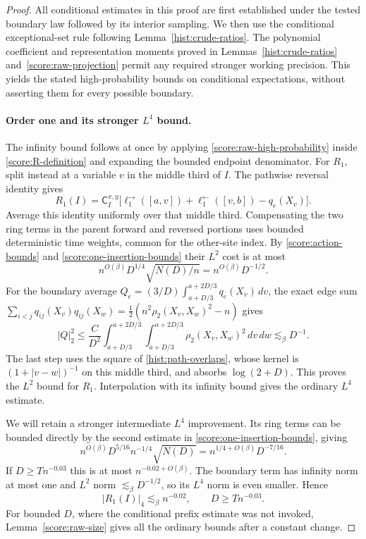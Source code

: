 \begin{proof}
All conditional estimates in this proof are first established under the
tested boundary law followed by its interior sampling.  We then use the
conditional exceptional-set rule following Lemma~\ref{hist:crude-ratios}.
The polynomial coefficient and representation moments proved in
Lemmas~\ref{hist:crude-ratios} and~\ref{score:raw-projection} permit any
required stronger working precision.
This yields the stated high-probability bounds on conditional expectations,
without asserting them for every possible boundary.

\paragraph{Order one and its stronger $L^4$ bound.}
The infinity bound follows at once by applying
\eqref{score:raw-high-probability} inside
\eqref{score:R-definition} and expanding the bounded endpoint denominator.
For $R_1$, split instead at a variable $v$ in the middle third of $I$.
The pathwise reversal identity gives
\[
 R_1(I)=\mathsf C_I^{x,y}\bigl[
       \ell_{1}^{\to}([a,v])+\ell_{1}^{\leftarrow}([v,b])-q_e(X_v)\bigr].
\]
Average this identity uniformly over that middle third.  Compensating the
two ring terms in the parent forward and reversed portions uses bounded
deterministic time weights, common for the other-site index.  By
\eqref{score:action-bounds} and \eqref{score:one-insertion-bounds} their
$L^2$ cost is at most
\[
 n^{O(\beta)}D^{1/4}\sqrt{N(D)/n}
       =n^{O(\beta)}D^{-1/2}.
\]
For the boundary average $Q_e=(3/D)\int_{a+D/3}^{a+2D/3}q_e(X_v)\,dv$,
the exact edge sum
$\sum_{i<j}q_{ij}(X_v)q_{ij}(X_w)
 =\tfrac12(n^2\rho_2(X_v,X_w)^2-n)$ gives
\[
 |Q|_2^2\le\frac{C}{D^2}\int_{a+D/3}^{a+2D/3}\int_{a+D/3}^{a+2D/3}
                       \rho_2(X_v,X_w)^2\,dv\,dw
       \lesssim_\beta D^{-1}.
\]
The last step uses the square of \eqref{hist:path-overlaps}, whose kernel
is $(1+|v-w|)^{-1}$ on this middle third, and absorbs $\log(2+D)$.
This proves the $L^2$ bound for $R_1$.  Interpolation with its infinity
bound gives the ordinary $L^4$ estimate.

We will retain a stronger intermediate $L^4$ improvement.  Its ring terms
can be bounded directly by the second estimate in
\eqref{score:one-insertion-bounds}, giving
\[
 n^{O(\beta)}D^{5/16}n^{-1/4}\sqrt{N(D)}
       =n^{1/4+O(\beta)}D^{-7/16}.
\]
If $D\ge Tn^{-0.03}$ this is at most $n^{-0.02+O(\beta)}$.
The boundary term has infinity norm at most one and $L^2$ norm
$\lesssim_\beta D^{-1/2}$, so its $L^4$ norm is even smaller.  Hence
\begin{equation}\label{score:R1-intermediate}
 |R_1(I)|_4\lesssim_\beta n^{-0.02},\qquad D\ge Tn^{-0.03}.
\end{equation}
For bounded $D$, where the conditional prefix estimate was not invoked,
Lemma~\ref{score:raw-size} gives all the ordinary bounds after a constant change.


\end{proof}
